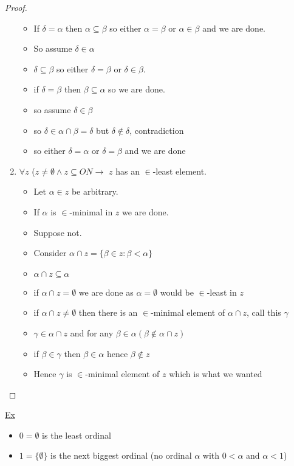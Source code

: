 \documentclass{article}
\begin{document}
\begin{proof}
\begin{enumerate}
\begin{itemize}
            \item If $\delta = \alpha$ then $\alpha \subseteq \beta$ so either $\alpha = \beta$ or $\alpha \in \beta$ and we are done.
            \item So assume $\delta \in \alpha$
            \item $\delta \subseteq \beta$ so either $\delta = \beta$ or $\delta \in \beta$.
            \item if $\delta = \beta$ then $\beta \subseteq \alpha$ so we are done.
            \item so assume $\delta \in \beta$
            \item so $\delta \in \alpha \cap \beta = \delta$ but $\delta \notin \delta$, contradiction
            \item so either $\delta = \alpha$ or $\delta = \beta$ and we are done
        \end{itemize}
        \item $\forall z$ ($z \neq \emptyset \wedge z \subseteq ON \rightarrow$ $z$ has an $\in$-least element.
        \begin{itemize}
            \item Let $\alpha \in z$ be arbitrary.
            \item If $\alpha$ is $\in$-minimal in $z$ we are done.
            \item Suppose not.
            \item Consider $\alpha \cap z = \{\beta \in z : \beta < \alpha\}$
            \item $\alpha \cap z \subseteq \alpha$
            \item if $\alpha \cap z = \emptyset$ we are done as $\alpha = \emptyset$ would be $\in$-least in $z$
            \item if $\alpha \cap z \neq \emptyset$ then there is an $\in$-minimal element of $\alpha \cap z$, call this $\gamma$
            \item $\gamma \in \alpha \cap z$ and for any $\beta \in \alpha (\beta \notin \alpha \cap z)$
            \item if $\beta \in \gamma$ then $\beta \in \alpha$ hence $\beta \notin z$
            \item Hence $\gamma$ is $\in$-minimal element of $z$ which is what we wanted
        \end{itemize}
    \end{enumerate}
\end{proof}

    \underline{Ex}
    \begin{itemize}
        \item $0=\emptyset$ is the least ordinal
        \item $1 = \{\emptyset\}$ is the next biggest ordinal (no ordinal $\alpha$ with $0 < \alpha$ and $\alpha < 1$)
    \end{itemize}
\end{document}
